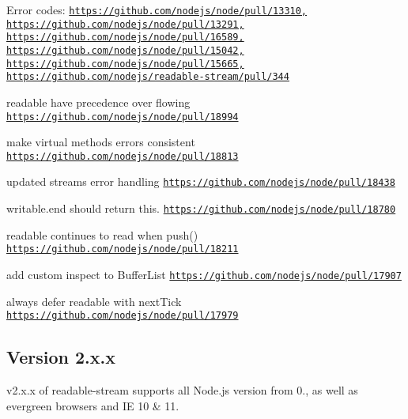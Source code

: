 \begin{DoxyEnumerate}
\item Error codes\+: \href{https://github.com/nodejs/node/pull/13310,}{\tt https\+://github.\+com/nodejs/node/pull/13310,} \href{https://github.com/nodejs/node/pull/13291,}{\tt https\+://github.\+com/nodejs/node/pull/13291,} \href{https://github.com/nodejs/node/pull/16589,}{\tt https\+://github.\+com/nodejs/node/pull/16589,} \href{https://github.com/nodejs/node/pull/15042,}{\tt https\+://github.\+com/nodejs/node/pull/15042,} \href{https://github.com/nodejs/node/pull/15665,}{\tt https\+://github.\+com/nodejs/node/pull/15665,} \href{https://github.com/nodejs/readable-stream/pull/344}{\tt https\+://github.\+com/nodejs/readable-\/stream/pull/344}
\item \textquotesingle{}readable\textquotesingle{} have precedence over flowing \href{https://github.com/nodejs/node/pull/18994}{\tt https\+://github.\+com/nodejs/node/pull/18994}
\item make virtual methods errors consistent \href{https://github.com/nodejs/node/pull/18813}{\tt https\+://github.\+com/nodejs/node/pull/18813}
\item updated streams error handling \href{https://github.com/nodejs/node/pull/18438}{\tt https\+://github.\+com/nodejs/node/pull/18438}
\item writable.\+end should return this. \href{https://github.com/nodejs/node/pull/18780}{\tt https\+://github.\+com/nodejs/node/pull/18780}
\item readable continues to read when push(\textquotesingle{}\textquotesingle{}) \href{https://github.com/nodejs/node/pull/18211}{\tt https\+://github.\+com/nodejs/node/pull/18211}
\item add custom inspect to Buffer\+List \href{https://github.com/nodejs/node/pull/17907}{\tt https\+://github.\+com/nodejs/node/pull/17907}
\item always defer \textquotesingle{}readable\textquotesingle{} with next\+Tick \href{https://github.com/nodejs/node/pull/17979}{\tt https\+://github.\+com/nodejs/node/pull/17979}
\end{DoxyEnumerate}

\subsection*{Version 2.\+x.\+x}

v2.\+x.\+x of {\ttfamily readable-\/stream} supports all Node.\+js version from 0., as well as evergreen browsers and IE 10 \& 11.

